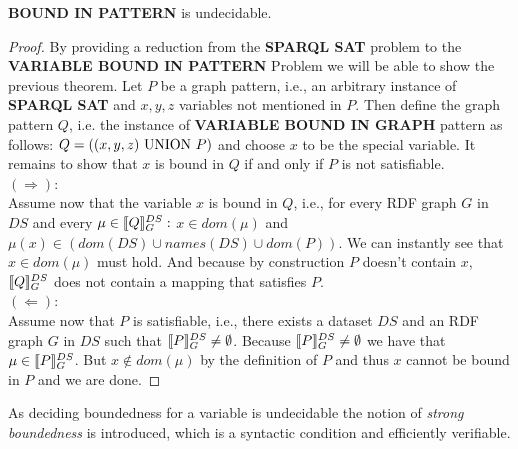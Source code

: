 \begin{theorem}
	\textbf{BOUND IN PATTERN} is undecidable.
\end{theorem}
\begin{proof}
By providing a reduction from the \textbf{SPARQL SAT} problem to the
\textbf{VARIABLE BOUND IN PATTERN} Problem we will be able to show the previous theorem.
Let $P$ be a graph pattern, i.e., an arbitrary instance of \textbf{SPARQL SAT} and
$x,y,z$ variables not mentioned in $P$. Then define the graph pattern $Q$,
i.e. the instance of \textbf{VARIABLE BOUND IN GRAPH} pattern as follows: $Q =
((x,y,z) \mbox{ UNION }  P)$ and choose $x$ to be the special variable.
It remains to show that $x$ is bound in $Q$  if and only if $P$ is not
satisfiable.\\
$(\Rightarrow)$:\\
Assume now that the variable $x$ is bound in $Q$, i.e., for every RDF graph $G$
in $DS$ and every $\mu \in \llbracket Q \rrbracket^{DS}_G:$ $x \in dom(\mu)$ and $\mu(x) \in
(dom(DS) \cup names(DS) \cup dom(P))$. We can instantly see that $x \in
dom(\mu)$ must hold. And because by construction $P$ doesn't contain $x$, $\llbracket Q
\rrbracket^{DS}_G$ does not contain a mapping that satisfies $P$.\\
\noindent$(\Leftarrow)$:\\
Assume now that $P$ is satisfiable, i.e., there exists a dataset $DS$ and an RDF
graph $G$ in $DS$ such that $\llbracket P \rrbracket^{DS}_G \neq \emptyset$. Because 
$\llbracket P \rrbracket^{DS}_G \neq \emptyset$ we have that $\mu \in \llbracket P \rrbracket^{DS}_G$. But
$x \notin dom(\mu)$ by the definition of $P$ and thus $x$ cannot be bound in
$P$ and we are done.
\end{proof} 

As deciding boundedness for a variable is undecidable the notion of
\emph{strong boundedness} is introduced, which is a syntactic condition and
efficiently verifiable. 

